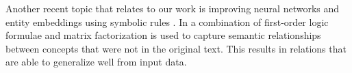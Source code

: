 Another recent topic that relates to our work is improving neural networks and entity embeddings using symbolic rules \cite{Hu2016}. In \cite{Rocktaschel2015} a combination of first-order logic formulae and matrix factorization is used to capture semantic relationships between concepts that were not in the original text. This results in relations that are able to generalize well from input data.  






